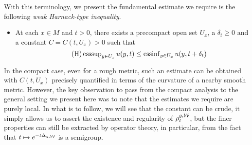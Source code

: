 \documentclass[a4paper, 12pt]{amsart}
\begin{document}
With this terminology, we present the fundamental estimate we
require is the following \emph{weak Harnack-type inequality}.
\begin{itemize}
\item[] At each $x \in M$ and $t > 0$, there exists a precompact
open set $U_x$, a $\delta_t \geq 0$ and a constant $C = C(t, U_x)  > 0$ such that
\begin{equation}
\tag{H}
\label{eq:Harnack}
\operatorname{esssup}_{y \in U_x} u(y,t) 
	\leq \operatorname{essinf}_{y \in U_x} u(y, t + \delta_t)
\end{equation}
\end{itemize}

In the compact case, even for a
rough metric, such an estimate can be
obtained with $C(t,U_x)$ precisely quantified
in terms of the curvature of a nearby smooth metric.
However, the key observation to pass from the compact analysis
to the general setting we present here was to note that
the estimates we require are purely local. In 
what is to follow, we will see that the constant can be
crude, it simply allows us to assert the existence and regularity
of $\rho^{g,\mathcal{W}}_t$, but the finer properties can still 
be extracted by operator theory, in particular, from the 
fact that $t \mapsto e^{-t\Delta_{g,\mathcal{W}}}$ is a semigroup.
\end{document}
